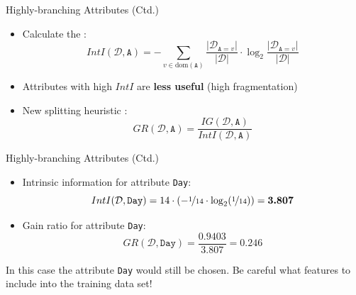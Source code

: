 \begin{frame}{Highly-branching Attributes (Ctd.)}{}
	\begin{itemize}
		\item Calculate the :
		\begin{equation}
			IntI(\mathcal{D}, \texttt{A})
				= -\sum_{v \in \text{dom}(\texttt{A})} \frac{\vert \mathcal{D}_{\texttt{A}=v} \vert}{\vert \mathcal{D} \vert} \cdot
					\log_2 \frac{\vert \mathcal{D}_{\texttt{A}=v} \vert}{\vert \mathcal{D} \vert}
		\end{equation}
		\item Attributes with high $IntI$ are \textbf{less useful} (high fragmentation)
		\item New splitting heuristic :
		\begin{equation}
			GR(\mathcal{D}, \texttt{A}) = \frac{IG(\mathcal{D}, \texttt{A})}{IntI(\mathcal{D}, \texttt{A})}
		\end{equation}
	\end{itemize}
\end{frame}


\begin{frame}{Highly-branching Attributes (Ctd.)}{}
	\begin{itemize}
		\item Intrinsic information for attribute \texttt{Day}:
		\begin{equation}
			IntI(\mathcal{D}, \texttt{Day}) = 14 \cdot (-\nicefrac{1}{14} \cdot \log_2 (\nicefrac{1}{14})) = \bm{3.807}
		\end{equation}
		\item Gain ratio for attribute \texttt{Day}:
		\begin{equation}
			GR(\mathcal{D}, \texttt{Day}) = \frac{0.9403}{3.807} = \bm{0.246}
		\end{equation}
	\end{itemize}

	\vspace*{-3mm}
	\begin{boxBlueNoFrame}
		\footnotesize
		In this case the attribute \texttt{Day} would still be chosen.
		Be careful what features to include into the training data set! 
	\end{boxBlueNoFrame}
\end{frame}


